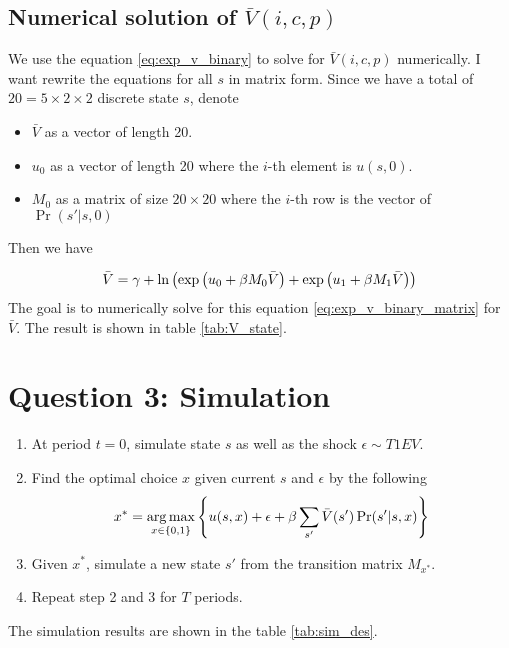\documentclass[12pt]{article}[margin=1in]
\begin{document}
\subsection{Numerical solution of $\bar{V}(i,c,p)$}
We use the equation \ref{eq:exp_v_binary} to solve for $\bar{V}(i,c,p)$ numerically.  I want rewrite the equations for all $s$ in matrix form. Since we have a total of $20=5\times 2\times 2$ discrete state $s$, denote
\begin{itemize}
    \item $\bar{V}$ as a vector of length 20.
    \item $u_0$ as a vector of length 20 where the $i$-th element is $u(s,0)$.
    \item $M_0$ as a matrix of size $20 \times 20$ where the $i$-th row is the vector of $\Pr(s'|s,0)$
\end{itemize}
Then we have

\begin{equation}\label{eq:exp_v_binary_matrix}
    \bar{V}= \gamma + \ln\left(\exp\left(u_0 + \beta M_0 \bar{V}\right) + \exp\left(u_1 + \beta M_1 \bar{V}\right)\right)
\end{equation}
The goal is to numerically solve for this equation \ref{eq:exp_v_binary_matrix}
for $\bar{V}$. The result is shown in table \ref{tab:V_state}.
\begin{table} \fontsize{10pt}{12pt}\selectfont
    \centering
    
    \label{tab:V_state}
\end{table}
\section{Question 3: Simulation}
\begin{enumerate}
    \item At period $t=0$, simulate state $s$ as well as the shock $\epsilon \sim T1EV$.
    \item Find the optimal choice $x$ given current $s$ and $\epsilon$ by the following \begin{equation*}
              x^* = \operatorname*{arg\,max}_{x
                  \in \{0,1\}}  \left\{ u(s,x) + \epsilon+ \beta
              \sum_{s'}\bar{V}(s')\Pr(s'|s,x) \right\}
          \end{equation*}
    \item Given $x^*$, simulate a new state $s'$ from the transition matrix $M_{x^*}$.
    \item Repeat step 2 and 3 for $T$ periods.
\end{enumerate}
The simulation results are shown in the table \ref{tab:sim_des}.
\begin{table} \fontsize{10pt}{12pt}\selectfont
    \centering
    
    \label{tab:sim_des}
\end{table}
\end{document}
